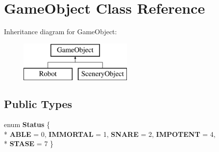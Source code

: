 \hypertarget{class_game_object}{}\section{Game\+Object Class Reference}
\label{class_game_object}
Inheritance diagram for Game\+Object\+:\begin{figure}[H]
\begin{center}
\leavevmode
\includegraphics[height=2.000000cm]{class_game_object}
\end{center}
\end{figure}
\subsection*{Public Types}
\begin{DoxyCompactItemize}
\item 
enum {\bfseries Status} \{ \\*
{\bfseries A\+B\+LE} = 0, 
{\bfseries I\+M\+M\+O\+R\+T\+AL} = 1, 
{\bfseries S\+N\+A\+RE} = 2, 
{\bfseries I\+M\+P\+O\+T\+E\+NT} = 4, 
\\*
{\bfseries S\+T\+A\+SE} = 7
 \}\hypertarget{class_game_object_aca8b21ad833fdc21a40d48dbc80d178c}{}\label{class_game_object_aca8b21ad833fdc21a40d48dbc80d178c}

\end{DoxyCompactItemize}
